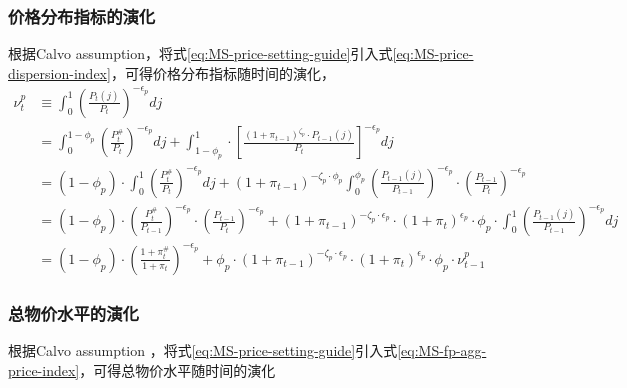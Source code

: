 \subsubsection{价格分布指标的演化}
根据Calvo assumption\citep{Calvo:1983uqa}，将式\eqref{eq:MS-price-setting-guide}引入式\eqref{eq:MS-price-dispersion-index}，可得价格分布指标随时间的演化，
\begin{equation}
\label{eq:MS-price-disp-index-evolution}
\begin{split}
\nu^p_t &\equiv \int_{0}^{1} \left(\frac{P_t(j)}{P_t}\right)^{-\epsilon_p} dj \\
&= \int_0^{1-\phi_p} \left(\frac{P_t^{\#}}{P_t}\right)^{-\epsilon_p} dj
+ \int_{1-\phi_p}^{1} \cdot \left[
\frac{
  \left(1+\pi_{t-1}\right)^{\zeta_p} \cdot P_{t-1}(j)
}{
  P_t
}
\right]^{-\epsilon_p} dj \\
&= \left(1-\phi_p\right) \cdot \int_0^1 \left(\frac{P_t^{\#}}{P_t}\right)^{-\epsilon_p} dj + \left(1+\pi_{t-1}\right)^{-\zeta_p \cdot \phi_p} \int_0^{\phi_p}
\left(\frac{P_{t-1}(j)}{P_{t-1}}\right)^{-\epsilon_p} \cdot
\left(\frac{P_{t-1}}{P_t}\right)^{-\epsilon_p} \\
&= \left(1-\phi_p\right) \cdot \left(\frac{P_t^{\#}}{P_{t-1}}\right)^{-\epsilon_p} \cdot \left(\frac{P_{t-1}}{P_{t}}\right)^{-\epsilon_p}+
\left(1+\pi_{t-1}\right)^{- \zeta_p \cdot \epsilon_p} \cdot
\left(1+\pi_t\right)^{\epsilon_p} \cdot \phi_p \cdot
\int_0^1 \left(\frac{P_{t-1}(j)}{P_{t-1}}\right)^{-\epsilon_p} dj\\
&= \left(1-\phi_p\right) \cdot \left(\frac{1+\pi_{t}^{\#}}{1+\pi_t}\right)^{-\epsilon_p} + \phi_p \cdot
\left(1+\pi_{t-1}\right)^{- \zeta_p \cdot \epsilon_p} \cdot
\left(1+\pi_t\right)^{\epsilon_p} \cdot \phi_p \cdot
\nu^p_{t-1}
\end{split}
\end{equation}

\subsubsection{总物价水平的演化}
根据Calvo assumption \citep{Calvo:1983uqa}，将式\eqref{eq:MS-price-setting-guide}引入式\eqref{eq:MS-fp-agg-price-index}，可得总物价水平随时间的演化

